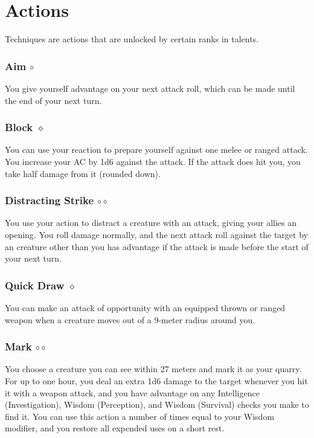\section{Actions}
Techniques are actions that are unlocked by certain ranks in talents. %


\subsubsection{Aim $\circ$} \label{act::aim}
    You give yourself advantage on your next attack roll, which can be made until the end of your next turn.

\subsubsection{Block $\diamond$} \label{act::block}
    You can use your reaction to prepare yourself against one melee or ranged attack.
    You increase your AC by 1d6 against the attack.
    If the attack does hit you, you take half damage from it (rounded down).

\subsubsection{Distracting Strike $\circ\circ$} \label{act::distractingstrike}
    You use your action to distract a creature with an attack, giving your allies an opening.
    You roll damage normally, and the next attack roll against the target by an creature other than you has advantage if the attack is made before the start of your next turn.

\subsubsection{Quick Draw $\diamond$} \label{act::quickdraw}
    You can make an attack of opportunity with an equipped thrown or ranged weapon when a creature moves out of a 9-meter radius around you.

\subsubsection{Mark $\circ\circ$} \label{act::mark}
    You choose a creature you can see within 27 meters and mark it as your quarry.
    For up to one hour, you deal an extra 1d6 damage to the target whenever you hit it with a weapon attack, and you have advantage on any Intelligence (Investigation), Wisdom (Perception), and Wisdom (Survival) checks you make to find it.
    You can use this action a number of times equal to your Wisdom modifier, and you restore all expended uses on a short rest.

